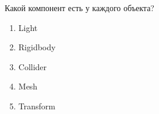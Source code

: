 
Какой компонент есть у каждого объекта?

\begin{enumerate}
    \item Light
    \item Rigidbody
    \item Collider
    \item Mesh
    \item Transform
\end{enumerate}